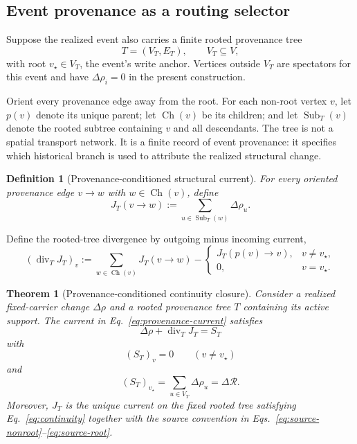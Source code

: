 \documentclass[aip,jmp,amsmath,amssymb,reprint]{revtex4-2}
\newtheorem{definition}{Definition}
\newtheorem{theorem}{Theorem}
\newcommand{\Rcal}{\mathcal{R}}
\newcommand{\divT}{\operatorname{div}_{T}}
\begin{document}
\subsection{Event provenance as a routing selector}

Suppose the realized event also carries a finite rooted provenance tree
\begin{equation}
T=(V_T,E_T),
\qquad V_T\subseteq V,
\end{equation}
with root $v_\star\in V_T$, the event's write anchor. Vertices outside $V_T$ are spectators for this event and have $\Delta\rho_i=0$ in the present construction.

Orient every provenance edge away from the root. For each non-root vertex $v$, let $p(v)$ denote its unique parent; let $\operatorname{Ch}(v)$ be its children; and let $\operatorname{Sub}_T(v)$ denote the rooted subtree containing $v$ and all descendants. The tree is not a spatial transport network. It is a finite record of event provenance: it specifies which historical branch is used to attribute the realized structural change.

\begin{definition}[Provenance-conditioned structural current]
For every oriented provenance edge $v\to w$ with $w\in\operatorname{Ch}(v)$, define
\begin{equation}
J_T(v\to w)
:=
\sum_{u\in\operatorname{Sub}_T(w)}\Delta\rho_u.
\label{eq:provenance-current}
\end{equation}
\end{definition}

Define the rooted-tree divergence by outgoing minus incoming current,
\begin{equation}
(\divT J_T)_v
:=
\sum_{w\in\operatorname{Ch}(v)}J_T(v\to w)
-
\begin{cases}
J_T(p(v)\to v), & v\neq v_\star,\\
0, & v=v_\star.
\end{cases}
\label{eq:tree-divergence}
\end{equation}

\begin{theorem}[Provenance-conditioned continuity closure]\label{thm:provenance-closure}
Consider a realized fixed-carrier change $\Delta\rho$ and a rooted provenance tree $T$ containing its active support. The current in Eq.~\eqref{eq:provenance-current} satisfies
\begin{equation}
\boxed{
\Delta\rho+\divT J_T=S_T
}
\label{eq:continuity}
\end{equation}
with
\begin{equation}
(S_T)_v=0
\qquad
(v\neq v_\star)
\label{eq:source-nonroot}
\end{equation}
and
\begin{equation}
(S_T)_{v_\star}
=\sum_{u\in V_T}\Delta\rho_u
=\Delta\Rcal.
\label{eq:source-root}
\end{equation}
Moreover, $J_T$ is the unique current on the fixed rooted tree satisfying Eq.~\eqref{eq:continuity} together with the source convention in Eqs.~\eqref{eq:source-nonroot}--\eqref{eq:source-root}.
\end{theorem}
\end{document}
